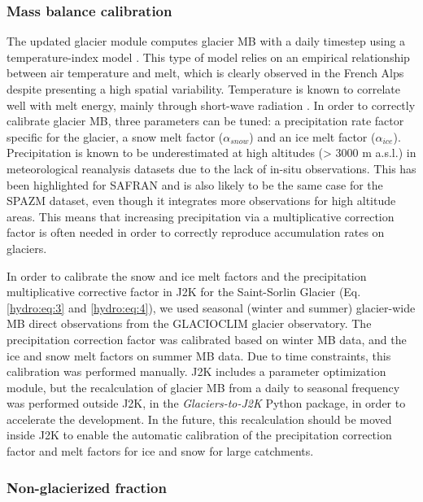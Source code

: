 \subsubsection{Mass balance calibration}

The updated glacier module computes glacier MB with a daily timestep using a temperature-index model \citep{hock_temperature_2003}. This type of model relies on an empirical relationship between air temperature and melt, which is clearly observed in the French Alps despite presenting a high spatial variability. Temperature is known to correlate well with melt energy, mainly through short-wave radiation \citep{sicart_glacier_2008}. In order to correctly calibrate glacier MB, three parameters can be tuned: a precipitation rate factor specific for the glacier, a snow melt factor ($\alpha_{snow}$) and an ice melt factor ($\alpha_{ice}$). Precipitation is known to be underestimated at high altitudes (> 3000 m a.s.l.) in meteorological reanalysis datasets due to the lack of in-situ observations. This has been highlighted for SAFRAN \citep{vionnet_sub-kilometer_2019} and is also likely to be the same case for the SPAZM dataset, even though it integrates more observations for high altitude areas. This means that increasing precipitation via a multiplicative correction factor is often needed in order to correctly reproduce accumulation rates on glaciers. 

In order to calibrate the snow and ice melt factors and the precipitation multiplicative corrective factor in J2K for the Saint-Sorlin Glacier (Eq. \ref{hydro:eq:3} and \ref{hydro:eq:4}), we used seasonal (winter and summer) glacier-wide MB direct observations from the GLACIOCLIM glacier observatory. The precipitation correction factor was calibrated based on winter MB data, and the ice and snow melt factors on summer MB data. Due to time constraints, this calibration was performed manually. J2K includes a parameter optimization module, but the recalculation of glacier MB from a daily to seasonal frequency was performed outside J2K, in the \textit{Glaciers-to-J2K} Python package, in order to accelerate the development. In the future, this recalculation should be moved inside J2K to enable the automatic calibration of the precipitation correction factor and melt factors for ice and snow for large catchments.

\subsubsection{Non-glacierized fraction}

